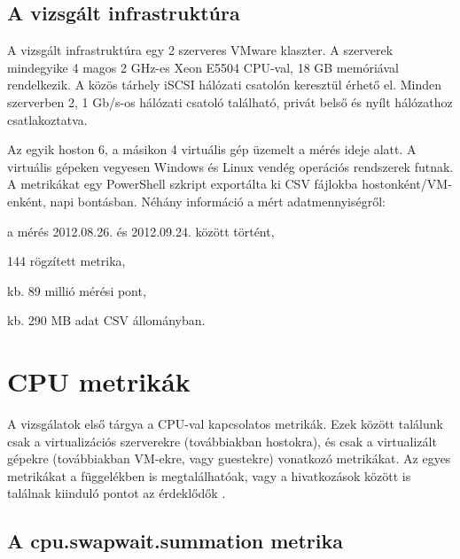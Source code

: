 \documentclass[a4paper,10pt,titlepage]{article}
\newenvironment{sajat_itemize}
{
	\begin{itemize}
	\setlength{\itemsep}{0pt}
}
{
	\end{itemize}
}
\begin{document}
\subsection{A vizsgált infrastruktúra}
A vizsgált infrastruktúra egy 2 szerveres VMware klaszter. A szerverek mindegyike 4 magos 2 GHz-es Xeon E5504 CPU-val, 18 GB memóriával rendelkezik. A közös tárhely iSCSI hálózati csatolón keresztül érhető el. Minden szerverben 2, 1 Gb/s-os hálózati csatoló található, privát belső és nyílt hálózathoz csatlakoztatva.

Az egyik hoston 6, a másikon 4 virtuális gép üzemelt a mérés ideje alatt. A virtuális gépeken vegyesen Windows és Linux vendég operációs rendszerek futnak. A metrikákat egy PowerShell szkript exportálta ki CSV fájlokba hostonként/VM-enként, napi bontásban. Néhány információ a mért adatmennyiségről:
\begin{sajat_itemize}
\item a mérés 2012.08.26. és 2012.09.24. között történt,
\item 144 rögzített metrika,
\item kb. 89 millió mérési pont,
\item kb. 290 MB adat CSV állományban.
\end{sajat_itemize}


\section{CPU metrikák}

A vizsgálatok első tárgya a CPU-val kapcsolatos metrikák. Ezek között találunk csak a virtualizációs szerverekre (továbbiakban hostokra), és csak a virtualizált gépekre (továbbiakban VM-ekre, vagy guestekre) vonatkozó metrikákat. Az egyes metrikákat a függelékben is megtalálhatóak, vagy a hivatkozások között is találnak kiinduló pontot az érdeklődők \cite{link:CC}.


\subsection{A cpu.swapwait.summation metrika}
\end{document}
